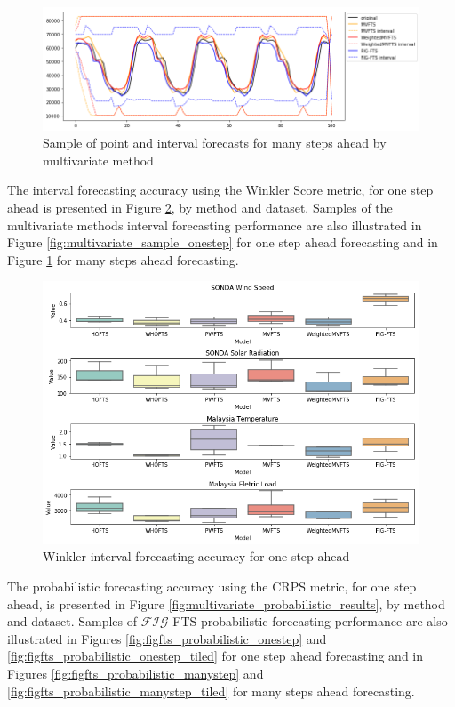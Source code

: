 \begin{figure}[htb]
    \centering
    \includegraphics[width=\textwidth]{figures/multivariate_sample_manystep.png}
    \caption{Sample of point and interval forecasts for many steps ahead by multivariate method}
    \label{fig:multivariate_sample_manystep}
\end{figure}

The interval forecasting accuracy using the Winkler Score metric, for one step ahead is presented in Figure \ref{fig:multivariate_interval_results}, by method and dataset. Samples of the multivariate methods interval forecasting performance are also illustrated in Figure \ref{fig:multivariate_sample_onestep} for one step ahead forecasting and in Figure \ref{fig:multivariate_sample_manystep} for many steps ahead forecasting.

\begin{figure}[htb]
    \centering
    \includegraphics[width=\textwidth]{figures/multivariate_point_results.png}
    \caption{Winkler interval forecasting accuracy for one step ahead}
    \label{fig:multivariate_interval_results}
\end{figure}

The probabilistic forecasting accuracy using the CRPS metric, for one step ahead, is presented in Figure \ref{fig:multivariate_probabilistic_results}, by method and dataset. Samples of $\mathcal{FIG}$-FTS probabilistic forecasting performance are also illustrated in Figures \ref{fig:figfts_probabilistic_onestep} and \ref{fig:figfts_probabilistic_onestep_tiled} for one step ahead forecasting and in Figures \ref{fig:figfts_probabilistic_manystep} and \ref{fig:figfts_probabilistic_manystep_tiled} for many steps ahead forecasting.

